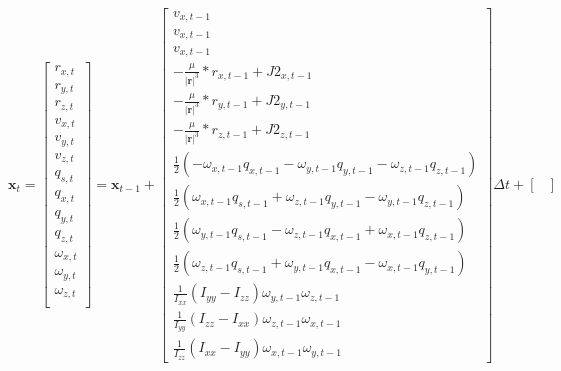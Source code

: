 \begin{equation}
    \mathbf{x}_t
    =
    \begin{bmatrix}
        r_{x,t} \\
        r_{y,t} \\
        r_{z,t} \\
        v_{x,t} \\
        v_{y,t} \\
        v_{z,t} \\
        q_{s,t} \\
        q_{x,t} \\
        q_{y,t} \\
        q_{z,t} \\
        \omega_{x,t} \\
        \omega_{y,t} \\
        \omega_{z,t} \\
    \end{bmatrix}
    = \mathbf{x}_{t-1} +
    \begin{bmatrix}
        v_{x,t-1} \\
        v_{x,t-1} \\
        v_{x,t-1} \\
        -\frac{\mu}{|\mathbf{r}|^3}*r_{x,t-1} + J2_{x,t-1} \\
        -\frac{\mu}{|\mathbf{r}|^3}*r_{y,t-1} + J2_{y,t-1} \\
        -\frac{\mu}{|\mathbf{r}|^3}*r_{z,t-1} + J2_{z,t-1} \\
        \frac{1}{2}(-\omega_{x,t-1}q_{x,t-1} - \omega_{y,t-1}q_{y,t-1} - \omega_{z,t-1}q_{z,t-1}) \\
        \frac{1}{2}( \omega_{x,t-1}q_{s,t-1} + \omega_{z,t-1}q_{y,t-1} - \omega_{y,t-1}q_{z,t-1}) \\
        \frac{1}{2}( \omega_{y,t-1}q_{s,t-1} - \omega_{z,t-1}q_{x,t-1} + \omega_{x,t-1}q_{z,t-1}) \\
        \frac{1}{2}( \omega_{z,t-1}q_{s,t-1} + \omega_{y,t-1}q_{x,t-1} - \omega_{x,t-1}q_{y,t-1}) \\
        \frac{1}{\mathit{I}_{xx}}(\mathit{I}_{yy}-\mathit{I}_{zz})\omega_{y,t-1}\omega_{z,t-1} \\
        \frac{1}{\mathit{I}_{yy}}(\mathit{I}_{zz}-\mathit{I}_{xx})\omega_{z,t-1}\omega_{x,t-1} \\
        \frac{1}{\mathit{I}_{zz}}(\mathit{I}_{xx}-\mathit{I}_{yy})\omega_{x,t-1}\omega_{y,t-1}
    \end{bmatrix}
    \Delta t + 
    \begin{bmatrix}

\end{bmatrix}
\end{equation}
